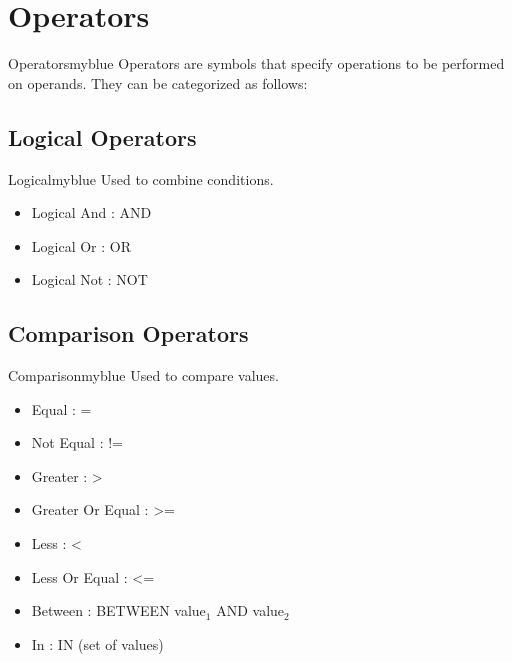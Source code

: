 \vspace{0.35cm}
\section{Operators}
\begin{prettyBox}{Operators}{myblue}
Operators are symbols that specify operations to be performed on operands. They can be categorized as follows:
\end{prettyBox}

\vspace{0.25cm}
\subsection{Logical Operators}
\begin{prettyBox}{Logical}{myblue}
Used to combine conditions.
          \begin{itemize} 
              \item Logical And : AND 
              \item Logical Or : OR 
              \item Logical Not : NOT 
              \end{itemize} 
\end{prettyBox}

\vspace{0.25cm}
\subsection{Comparison Operators}
\begin{prettyBox}{Comparison}{myblue}
Used to compare values.
    \begin{itemize}
             \item Equal : = 
             \item Not Equal : != 
             \item Greater : \textgreater
             \item Greater Or Equal : \textgreater= 
             \item Less : \textless
             \item Less Or Equal : \textless= 
             \item Between : BETWEEN value$_{1}$ AND value$_{2}$
             \item In : IN (set of values)
             \end{itemize} 
\end{prettyBox}

\vspace{0.25cm}
